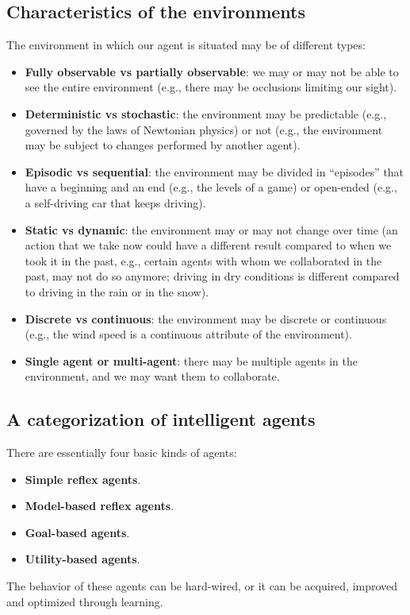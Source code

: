 \subsection{Characteristics of the environments}
The environment in which our agent is situated may be of different types:
\begin{itemize}
    \item \textbf{Fully observable vs partially observable}: we may or may not be able to see the entire environment (e.g., there may be occlusions limiting our sight).
    \item \textbf{Deterministic vs stochastic}: the environment may be predictable (e.g., governed by the laws of Newtonian physics) or not (e.g., the environment may be subject to changes performed by another agent).
    \item \textbf{Episodic vs sequential}: the environment may be divided in “episodes” that have a beginning and an end (e.g., the levels of a game) or open-ended (e.g., a self-driving car that keeps driving).
    \item \textbf{Static vs dynamic}: the environment may or may not change over time (an action that we take now could have a different result compared to when we took it in the past, e.g., certain agents with whom we collaborated in the past, may not do so anymore; driving in dry conditions is different compared to driving in the rain or in the snow).
    \item \textbf{Discrete vs continuous}: the environment may be discrete or continuous (e.g., the wind speed is a continuous attribute of the environment).
    \item \textbf{Single agent or multi-agent}: there may be multiple agents in the environment, and we may want them to collaborate.
\end{itemize}

\subsection{A categorization of intelligent agents}
There are essentially four basic kinds of agents:
\begin{itemize}
    \item \textbf{Simple reflex agents}.
    \item \textbf{Model-based reflex agents}.
    \item \textbf{Goal-based agents}.
    \item \textbf{Utility-based agents}.
\end{itemize}
The behavior of these agents can be hard-wired, or it can be acquired, improved and optimized through learning.

